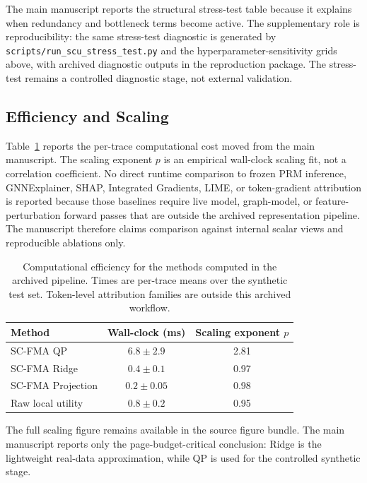 \documentclass[pdflatex,sn-mathphys-num]{sn-jnl}
\begin{document}
The main manuscript reports the structural stress-test table because it explains when redundancy and bottleneck terms become active. The supplementary role is reproducibility: the same stress-test diagnostic is generated by \texttt{scripts/run\_scu\_stress\_test.py} and the hyperparameter-sensitivity grids above, with archived diagnostic outputs in the reproduction package. The stress-test remains a controlled diagnostic stage, not external validation.

\subsection{Efficiency and Scaling}
\label{app:efficiency-scaling}

Table~\ref{tab:supp-efficiency} reports the per-trace computational cost moved from the main manuscript. The scaling exponent $p$ is an empirical wall-clock scaling fit, not a correlation coefficient. No direct runtime comparison to frozen PRM inference, GNNExplainer, SHAP, Integrated Gradients, LIME, or token-gradient attribution is reported because those baselines require live model, graph-model, or feature-perturbation forward passes that are outside the archived representation pipeline. The manuscript therefore claims comparison against internal scalar views and reproducible ablations only.

\begin{table}[ht]
\caption{Computational efficiency for the methods computed in the archived pipeline. Times are per-trace means over the synthetic test set. Token-level attribution families are outside this archived workflow.}
\label{tab:supp-efficiency}
\centering
\small
\begin{tabular}{lcc}
\toprule
\textbf{Method} & \textbf{Wall-clock (ms)} & \textbf{Scaling exponent $p$} \\
\midrule
SC-FMA QP & $6.8 \pm 2.9$ & 2.81 \\
SC-FMA Ridge & $0.4 \pm 0.1$ & 0.97 \\
SC-FMA Projection & $0.2 \pm 0.05$ & 0.98 \\
Raw local utility & $0.8 \pm 0.2$ & 0.95 \\
\bottomrule
\end{tabular}
\end{table}

The full scaling figure remains available in the source figure bundle. The main manuscript reports only the page-budget-critical conclusion: Ridge is the lightweight real-data approximation, while QP is used for the controlled synthetic stage.
\end{document}
